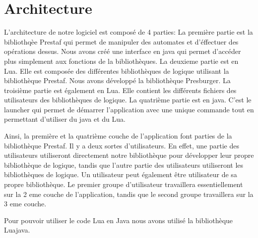\documentclass{article}%
\begin{document}
\section{Architecture}

L'architecture de notre logiciel est composé de 4 parties:
La première partie est la bibliothqèe Prestaf qui permet de manipuler des automates et d'éffectuer des opérations dessus. Nous avons créé une interface en java qui permet d'accéder plus simplement aux fonctions de la bibliothèques.
La deuxieme partie est en Lua. Elle est composée des différentes bibliothèques de logique utilisant la bibliothèque Prestaf. Nous avons développé la bibliothèque Presburger.
La troisième partie est également en Lua. Elle contient les différents fichiers des utilisateurs des bibliothèques de logique.
La quatrième partie est en java. C'est le launcher qui permet de démarrer l'application avec une unique commande tout en permettant d'utiliser du java et du Lua.

Ainsi, la première et la quatrième couche de l'application font parties de la bibliothèque Prestaf. Il y a deux sortes d'utilisateurs. En effet, une partie des utilisateurs utiliseront directement notre bibliothèque pour développer leur propre bibliothèque de logique,
tandis que l'autre partie des utilisateurs utiliseront les bibliothèques de logique. Un utilisateur peut également être utilisateur de sa propre bibliothèque. Le premier groupe d'utilisateur travaillera essentiellement sur la 2 eme couche de l'application, 
tandis que le second groupe travaillera sur la 3 eme couche.

Pour pouvoir utiliser le code Lua en Java nous avons utilisé la bibliothèque Luajava.
\end{document}
